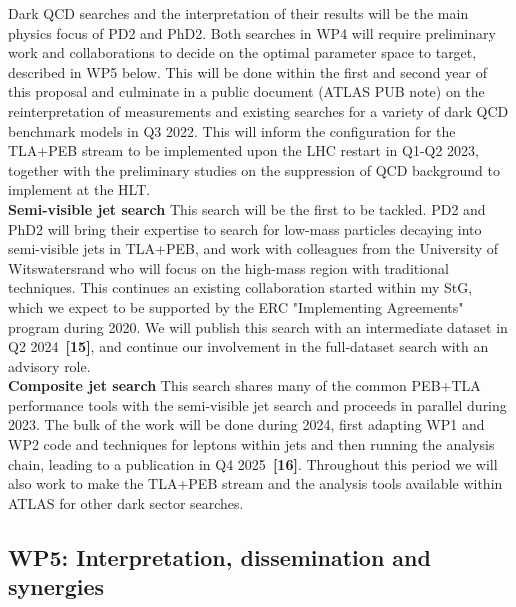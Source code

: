 Dark QCD searches and the interpretation of their results will be the main physics focus of PD2 and PhD2. 
Both searches in WP4 will require preliminary work and collaborations to decide on the optimal parameter space to target, described in WP5 below. 
This will be done within the first and second year of this proposal and culminate in a public document (ATLAS PUB note) on the reinterpretation of measurements and existing searches for a variety of dark QCD benchmark models in Q3 2022. 
This will inform the configuration for the TLA+PEB stream to be implemented upon the LHC restart in Q1-Q2 2023, 
together with the preliminary studies on the suppression of QCD background to implement at the HLT. \\
\textbf{Semi-visible jet search} This search will be the first to be tackled.
PD2 and PhD2 will bring their expertise to search for low-mass particles decaying into semi-visible jets in TLA+PEB, and work with colleagues from the University of Witswatersrand who will focus on the high-mass region with traditional techniques. 
This continues an existing collaboration started within my StG, which we expect to be supported by the ERC "Implementing Agreements" program during 2020.
We will publish this search with an intermediate dataset in Q2 2024~\textbf{[15]}, and continue our involvement in the full-dataset search with an advisory role. \\
\textbf{Composite jet search} This search shares many of the common PEB+TLA performance tools with the semi-visible jet search and proceeds in parallel during 2023. 
The bulk of the work will be done during 2024, first adapting WP1 and WP2 code and techniques for leptons within jets and then running the analysis chain, leading to a publication in Q4 2025~\textbf{[16]}. 
Throughout this period we will also work to make the TLA+PEB stream and the analysis tools available within ATLAS for other dark sector searches. 

\subsection{WP5: Interpretation, dissemination and synergies}

